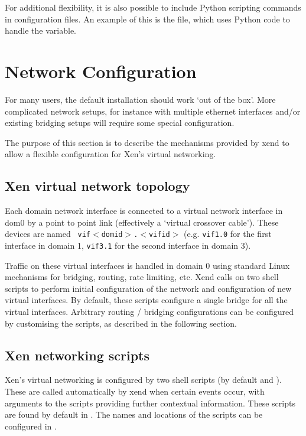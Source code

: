 \documentclass[11pt,twoside,final,openright]{report}
\def\xend{{xend}\xspace}
\begin{document}
{For additional flexibility, it is also possible to include Python
scripting commands in configuration files.  An example of this is the
 file, which uses Python code to handle the 
 variable.



\section{Network Configuration}

For many users, the default installation should work `out of the box'.
More complicated network setups, for instance with multiple ethernet
interfaces and/or existing bridging setups will require some
special configuration.

The purpose of this section is to describe the mechanisms provided by
\xend to allow a flexible configuration for Xen's virtual networking.

\subsection{Xen virtual network topology}

Each domain network interface is connected to a virtual network
interface in dom0 by a point to point link (effectively a `virtual
crossover cable').  These devices are named {\tt
vif$<$domid$>$.$<$vifid$>$} (e.g. {\tt vif1.0} for the first interface
in domain 1, {\tt vif3.1} for the second interface in domain 3).

Traffic on these virtual interfaces is handled in domain 0 using
standard Linux mechanisms for bridging, routing, rate limiting, etc.
Xend calls on two shell scripts to perform initial configuration of
the network and configuration of new virtual interfaces.  By default,
these scripts configure a single bridge for all the virtual
interfaces.  Arbitrary routing / bridging configurations can be
configured by customising the scripts, as described in the following
section.

\subsection{Xen networking scripts}

Xen's virtual networking is configured by two shell scripts (by
default  and ).  These are
called automatically by \xend when certain events occur, with
arguments to the scripts providing further contextual information.
These scripts are found by default in .  The
names and locations of the scripts can be configured in
.

}
\end{document}
